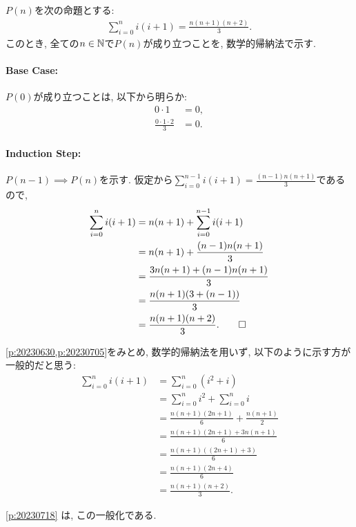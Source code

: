\begin{proof*}
  $P(n)$を次の命題とする:
  \begin{align*}
    \sum_{i=0}^n i(i+1)=\frac{n(n+1)(n+2)}{3}.
  \end{align*}
  このとき,
  全ての$n\in\mathbb{N}$で$P(n)$が成り立つことを,
  数学的帰納法で示す.

  \paragraph{Base Case:}
  $P(0)$が成り立つことは, 以下から明らか:
    \begin{align*}
      0\cdot 1&=0,\\
      \frac{0\cdot 1\cdot 2}{3}&=0.
  \end{align*}

  \paragraph{Induction Step:}
  $P(n-1)\implies P(n)$を示す.
  仮定から$\sum_{i=0}^{n-1} i(i+1)=\frac{(n-1)n(n+1)}{3}$であるので,
  \begin{align*}
    \sum_{i=0}^n i(i+1)
    &=n(n+1)+\sum_{i=0}^{n-1} i(i+1)\\
    &=n(n+1)+\frac{(n-1)n(n+1)}{3}\\
    &=\frac{3n(n+1)+(n-1)n(n+1)}{3}\\
    &=\frac{n(n+1)(3+(n-1))}{3}\\ 
    &=\frac{n(n+1)(n+2)}{3}
    .\qedhere
  \end{align*}
\end{proof*}
\begin{rem}
  \cref{p:20230630,p:20230705}をみとめ,
  数学的帰納法を用いず, 以下のように示す方が一般的だと思う:
  \begin{align*}
    \sum_{i=0}^n i(i+1)
    &=\sum_{i=0}^n (i^2+i)\\
    &=\sum_{i=0}^n i^2+\sum_{i=0}^n i\\
    &=\frac{n(n+1)(2n+1)}{6}+\frac{n(n+1)}{2}\\
    &=\frac{n(n+1)(2n+1)+3n(n+1)}{6}\\
    &=\frac{n(n+1)((2n+1)+3)}{6}\\
    &=\frac{n(n+1)(2n+4)}{6}\\
    &=\frac{n(n+1)(n+2)}{3}.
  \end{align*}
\end{rem}
\begin{rem}
\cref{p:20230718}
は,
この一般化である.
\end{rem}


